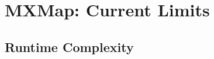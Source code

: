 







\section{MXMap: Current Limits}
\label{appsec:mxmap_limits}

\subsection{Runtime Complexity}

